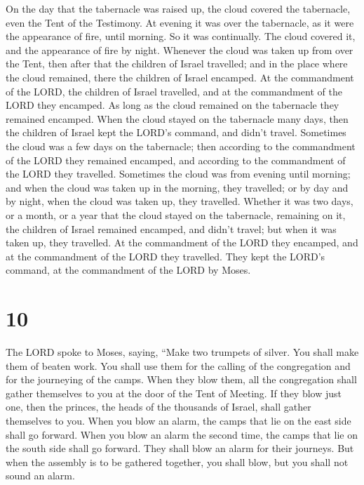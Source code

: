  On the day that the tabernacle was raised up, the cloud
covered the tabernacle, even the Tent of the Testimony. At evening it
was over the tabernacle, as it were the appearance of fire, until
morning.  So it was continually. The cloud covered it, and
the appearance of fire by night.  Whenever the cloud was
taken up from over the Tent, then after that the children of Israel
travelled; and in the place where the cloud remained, there the children
of Israel encamped.  At the commandment of the LORD, the
children of Israel travelled, and at the commandment of the LORD they
encamped. As long as the cloud remained on the tabernacle they remained
encamped.  When the cloud stayed on the tabernacle many
days, then the children of Israel kept the LORD's command, and didn't
travel.  Sometimes the cloud was a few days on the
tabernacle; then according to the commandment of the LORD they remained
encamped, and according to the commandment of the LORD they travelled.
 Sometimes the cloud was from evening until morning; and
when the cloud was taken up in the morning, they travelled; or by day
and by night, when the cloud was taken up, they travelled. 
Whether it was two days, or a month, or a year that the cloud stayed on
the tabernacle, remaining on it, the children of Israel remained
encamped, and didn't travel; but when it was taken up, they travelled.
 At the commandment of the LORD they encamped, and at the
commandment of the LORD they travelled. They kept the LORD's command, at
the commandment of the LORD by Moses.

\hypertarget{section-9}{%
\section{10}\label{section-9}}

 The LORD spoke to Moses, saying,  ``Make two
trumpets of silver. You shall make them of beaten work. You shall use
them for the calling of the congregation and for the journeying of the
camps.  When they blow them, all the congregation shall
gather themselves to you at the door of the Tent of Meeting.
 If they blow just one, then the princes, the heads of the
thousands of Israel, shall gather themselves to you.  When
you blow an alarm, the camps that lie on the east side shall go forward.
 When you blow an alarm the second time, the camps that lie
on the south side shall go forward. They shall blow an alarm for their
journeys.  But when the assembly is to be gathered together,
you shall blow, but you shall not sound an alarm.

